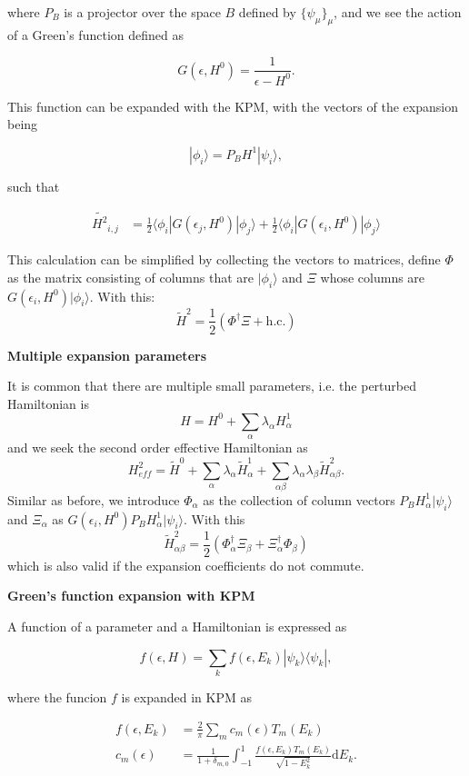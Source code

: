 \documentclass[10pt, onecolumn, aps, prb, superscriptaddress, floatfix, showpacs, notitlepage]{revtex4-1}
\newcommand{\bra}[1]{\langle #1|}
\newcommand{\ket}[1]{|#1\rangle}
\begin{document}
where $P_B$ is a projector over the space $B$ defined by $\{\psi_\mu\}_\mu$,
and we see the action of a Green's function defined as

$$
G(\epsilon, H^0) = \frac{1}{\epsilon-H^0}.
$$

This function can be expanded with the KPM, with the vectors of the expansion
being

$$
\ket{\phi_i} = P_B H^1\ket{\psi_i},
$$


such that


\begin{align}
\tilde{H^2}_{i,j} &= \frac{1}{2}
\bra{\phi_i} G(\epsilon_j, H^0) \ket{\phi_j}
+
\frac{1}{2}
\bra{\phi_i} G(\epsilon_i, H^0) \ket{\phi_j}
\end{align}

This calculation can be simplified by collecting the vectors to matrices, define $\Phi$ as the matrix consisting of columns that are $\ket{\phi_i}$ and $\Xi$ whose columns are $G(\epsilon_i, H^0) \ket{\phi_i}$. With this:
\begin{equation}
\tilde{H}^2 = \frac{1}{2} (\Phi^\dag \Xi + \text{h.c.})
\end{equation}

\textbf{Multiple expansion parameters}

It is common that there are multiple small parameters, i.e. the perturbed Hamiltonian is
\[H = H^0 + \sum_{\alpha} \lambda_{\alpha} H^1_{\alpha}\]
and we seek the second order effective Hamiltonian as
\[H_{eff}^2 = \tilde{H}^0 +  \sum_{\alpha} \lambda_{\alpha} \tilde{H}^1_{\alpha} +  \sum_{\alpha\beta} \lambda_{\alpha}\lambda_{\beta}\tilde{H}^2_{\alpha\beta}.\]
Similar as before, we introduce $\Phi_{\alpha}$ as the collection of column vectors $P_B H^1_{\alpha}\ket{\psi_i}$ and $\Xi_{\alpha}$ as $G(\epsilon_i, H^0) P_B H^1_{\alpha}\ket{\psi_i}$. With this
\[\tilde{H}^2_{\alpha\beta} = \frac{1}{2} (\Phi_{\alpha}^\dag \Xi_{\beta} + \Xi_{\alpha}^\dag\Phi_{\beta})\]
which is also valid if the expansion coefficients do not commute.

\textbf{Green's function expansion with KPM}

A function of a parameter and a Hamiltonian is expressed as 

$$
f(\epsilon, H) = \sum_k f(\epsilon, E_k) \ket{\psi_k}\bra{\psi_k},
$$

where the funcion $f$ is expanded in KPM as

\begin{align}
f(\epsilon, E_k) &= \frac{2}{\pi}\sum_m c_m(\epsilon)T_m(E_k)\\
c_m(\epsilon) &=\frac{1}{1+\delta_{m,0}}
\int_{-1}^1 \frac{f(\epsilon, E_k) T_m(E_k)}{\sqrt{1-E_k^2}}\mathrm{d}E_k.
\end{align}
\end{document}
